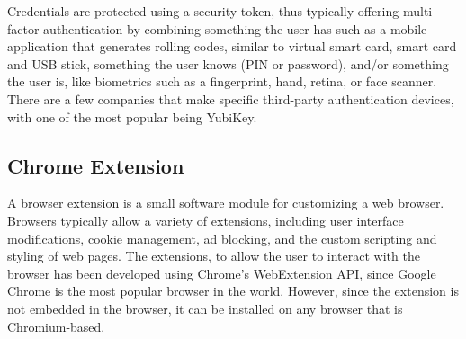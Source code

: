 Credentials are protected using a security token, thus typically offering multi-factor authentication by combining something the user has such as a mobile application that generates rolling codes, similar to virtual smart card, smart card and USB stick, something the user knows (PIN or password), and/or
something the user is, like biometrics such as a fingerprint, hand, retina, or face scanner.
There are a few companies that make specific third-party authentication devices, with one of the most popular being YubiKey.

\subsection{Chrome Extension}

A browser extension is a small software module for customizing a web browser. Browsers typically allow a variety of extensions, including user interface modifications, cookie management, ad blocking, and the custom scripting and styling of web pages.
The extensions, to allow the user to interact with the browser has been developed using Chrome's WebExtension API, since Google Chrome is the most popular browser in the world. However, since the extension is not embedded in the browser, it can be installed on any browser that is Chromium-based.
